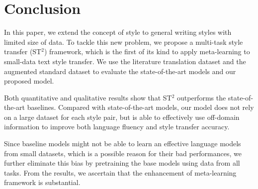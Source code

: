 \section{Conclusion}
\label{sec:conclude}

In this paper, we extend the concept of style to general writing styles with limited size of data. To tackle this new problem, we propose a multi-task style transfer (ST$^2$) framework, which is the first of its kind to apply meta-learning to small-data text style transfer. We use the literature translation dataset and the augmented standard dataset to evaluate the state-of-the-art models and our proposed model. 

Both quantitative and qualitative results show that ST$^2$ outperforms the state-of-the-art baselines. Compared with state-of-the-art models, our model does not rely on a large dataset for each style pair, but is able to effectively use off-domain information to improve both language fluency and style transfer accuracy.

Since baseline models might not be able to learn an effective language models from small datasets, which is a possible reason for their bad performances, we further eliminate this bias by pretraining the base models using data from all tasks. From the results, we ascertain that the enhancement of meta-learning framework is substantial.
